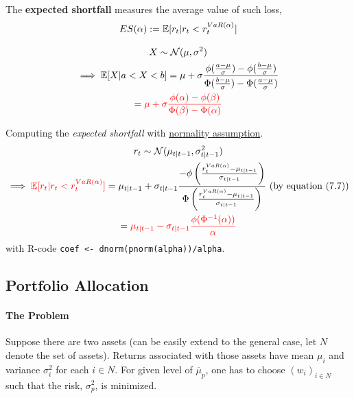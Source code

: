 \documentclass[11pt]{article}
\begin{document}
			\begin{definition}
				The \textbf{expected shortfall} measures the average value of such loss,
				\begin{equation}
					ES(\alpha) := \mathbb{E}[{r_t|r_t < r_t^{VaR(\alpha)}}]
				\end{equation}
			\end{definition}
			
			\begin{lemma}
				\begin{gather}
					X \sim \mathcal{{N}}(\mu, \sigma^2) \\
					\implies \mathbb{E}[{X|a < X < b}] = \mu + \sigma \frac{\phi(\frac{a - \mu}{\sigma}) - \phi(\frac{b - \mu}{\sigma})}{\Phi(\frac{b - \mu}{\sigma}) - \Phi(\frac{a - \mu}{\sigma})} \\
					= \textcolor{red}{\mu + \sigma \frac{\phi(\alpha) - \phi(\beta)}{\Phi(\beta) - \Phi(\alpha)}}
				\end{gather}
			\end{lemma}
			
			\begin{proposition}
				Computing the \emph{expected shortfall} with \ul{normality assumption}.
				\begin{gather}
					r_t \sim \mathcal{{N}}(\mu_{t|t-1}, \sigma_{t|t-1}^2) \\
					\implies \textcolor{red}{\mathbb{E}[{r_t|r_t < r_t^{VaR(\textcolor{red}{\alpha})}}]}  = \mu_{t|t-1} + \sigma_{t|t-1} 
					\frac{-\phi \left( 
						\frac{r_t^{VaR(\alpha)} - \mu_{t|t-1}}{\sigma_{t|t-1}}
					\right)}
					{\Phi \left(
						\frac{r_t^{VaR(\alpha)} - \mu_{t|t-1}}{\sigma_{t|t-1}} 
					\right)} \text{{ (by equation (7.7))}}\\
					= \textcolor{red}{\mu_{t|t-1} - \sigma_{t|t-1} \frac{\phi(\Phi^{-1}(\alpha))}{\alpha}}
				\end{gather}
				with R-code \texttt{coef <- dnorm(pnorm(alpha))/alpha}.
			\end{proposition}
		
		\subsection{Portfolio Allocation}
			\paragraph{The Problem}Suppose there are two assets (can be easily extend to the general case, let $N$ denote the set of assets). Returns associated with those assets have mean $\mu_i$ and variance $\sigma_i^2$ for each $i \in N$. For given level of $\overline{\mu}_p$, one has to choose $(w_i)_{i \in N}$ such that the risk, $\sigma^2_p$, is minimized.
			
\end{document}
